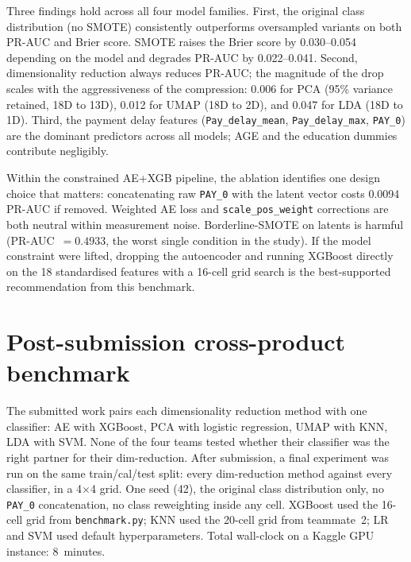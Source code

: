 \documentclass[12pt,a4paper]{article}
\begin{document}
Three findings hold across all four model families. First, the original
class distribution (no SMOTE) consistently outperforms oversampled variants
on both PR-AUC and Brier score. SMOTE raises the Brier score by 0.030--0.054
depending on the model and degrades PR-AUC by 0.022--0.041. Second,
dimensionality reduction always reduces PR-AUC; the magnitude of the drop
scales with the aggressiveness of the compression: 0.006 for PCA (95\%
variance retained, 18D to 13D), 0.012 for UMAP (18D to 2D), and 0.047 for
LDA (18D to 1D). Third, the payment delay features
(\texttt{Pay\_delay\_mean}, \texttt{Pay\_delay\_max}, \texttt{PAY\_0})
are the dominant predictors across all models; AGE and the education dummies
contribute negligibly.

Within the constrained AE+XGB pipeline, the ablation identifies one design
choice that matters: concatenating raw \texttt{PAY\_0} with the latent
vector costs 0.0094 PR-AUC if removed. Weighted AE loss and
\texttt{scale\_pos\_weight} corrections are both neutral within measurement
noise. Borderline-SMOTE on latents is harmful (PR-AUC~$= 0.4933$, the worst
single condition in the study). If the model constraint were lifted, dropping
the autoencoder and running XGBoost directly on the 18 standardised features
with a 16-cell grid search is the best-supported recommendation from
this benchmark.

\section{Post-submission cross-product benchmark}

The submitted work pairs each dimensionality reduction method with one
classifier: AE with XGBoost, PCA with logistic regression, UMAP with KNN, LDA
with SVM. None of the four teams tested whether their classifier was the
right partner for their dim-reduction. After submission, a final experiment
was run on the same train/cal/test split: every dim-reduction method against
every classifier, in a 4$\times$4 grid. One seed (42), the original class
distribution only, no \texttt{PAY\_0} concatenation, no class reweighting
inside any cell. XGBoost used the 16-cell grid from \texttt{benchmark.py};
KNN used the 20-cell grid from teammate~2; LR and SVM used default
hyperparameters. Total wall-clock on a Kaggle GPU instance: 8~minutes.
\end{document}
